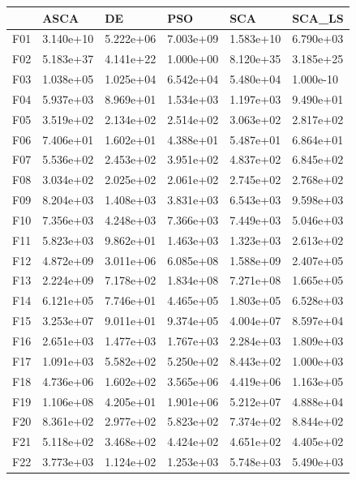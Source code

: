 \begin{tabular}{llllll}
\toprule
{} &       ASCA &         DE &        PSO &        SCA &     SCA\_LS \\
\midrule
F01  &  3.140e+10 &  5.222e+06 &  7.003e+09 &  1.583e+10 &  6.790e+03 \\
F02  &  5.183e+37 &  4.141e+22 &  1.000e+00 &  8.120e+35 &  3.185e+25 \\
F03  &  1.038e+05 &  1.025e+04 &  6.542e+04 &  5.480e+04 &  1.000e-10 \\
F04  &  5.937e+03 &  8.969e+01 &  1.534e+03 &  1.197e+03 &  9.490e+01 \\
F05  &  3.519e+02 &  2.134e+02 &  2.514e+02 &  3.063e+02 &  2.817e+02 \\
F06  &  7.406e+01 &  1.602e+01 &  4.388e+01 &  5.487e+01 &  6.864e+01 \\
F07  &  5.536e+02 &  2.453e+02 &  3.951e+02 &  4.837e+02 &  6.845e+02 \\
F08  &  3.034e+02 &  2.025e+02 &  2.061e+02 &  2.745e+02 &  2.768e+02 \\
F09  &  8.204e+03 &  1.408e+03 &  3.831e+03 &  6.543e+03 &  9.598e+03 \\
F10  &  7.356e+03 &  4.248e+03 &  7.366e+03 &  7.449e+03 &  5.046e+03 \\
F11  &  5.823e+03 &  9.862e+01 &  1.463e+03 &  1.323e+03 &  2.613e+02 \\
F12  &  4.872e+09 &  3.011e+06 &  6.085e+08 &  1.588e+09 &  2.407e+05 \\
F13  &  2.224e+09 &  7.178e+02 &  1.834e+08 &  7.271e+08 &  1.665e+05 \\
F14  &  6.121e+05 &  7.746e+01 &  4.465e+05 &  1.803e+05 &  6.528e+03 \\
F15  &  3.253e+07 &  9.011e+01 &  9.374e+05 &  4.004e+07 &  8.597e+04 \\
F16  &  2.651e+03 &  1.477e+03 &  1.767e+03 &  2.284e+03 &  1.809e+03 \\
F17  &  1.091e+03 &  5.582e+02 &  5.250e+02 &  8.443e+02 &  1.000e+03 \\
F18  &  4.736e+06 &  1.602e+02 &  3.565e+06 &  4.419e+06 &  1.163e+05 \\
F19  &  1.106e+08 &  4.205e+01 &  1.901e+06 &  5.212e+07 &  4.888e+04 \\
F20  &  8.361e+02 &  2.977e+02 &  5.823e+02 &  7.374e+02 &  8.844e+02 \\
F21  &  5.118e+02 &  3.468e+02 &  4.424e+02 &  4.651e+02 &  4.405e+02 \\
F22  &  3.773e+03 &  1.124e+02 &  1.253e+03 &  5.748e+03 &  5.490e+03 \\

\end{tabular}
